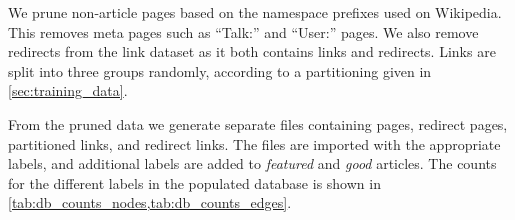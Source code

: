 
\begin{center}
\end{center}

We prune non-article pages based on the namespace prefixes used on Wikipedia. This removes meta pages such as \enquote{Talk:} and \enquote{User:} pages. We also remove redirects from the link dataset as it both contains links and redirects. Links are split into three groups randomly, according to a partitioning given in \cref{sec:training_data}. 

From the pruned data we generate separate files containing pages, redirect pages, partitioned links, and redirect links. The files are imported with the appropriate labels, and additional labels are added to \emph{featured} and \emph{good} articles.
 The counts for the different labels in the populated database is shown in \cref{tab:db_counts_nodes,tab:db_counts_edges}.

